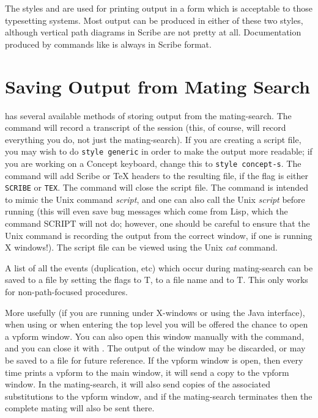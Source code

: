 The styles  and  are used for printing output
in a form which is acceptable to those typesetting systems. Most {\TPS} output
can be produced in either of these two styles, although vertical path diagrams
in Scribe are not pretty at all. Documentation produced by commands like
 is always in Scribe format.


\section{Saving Output from Mating Search}

{\TPS} has several available methods of storing output from the mating-search.
The  command will record a transcript of the session
(this, of course, will record everything you do, not just the mating-search).
If you are creating a script file, you may wish to do {\tt style generic} in
order to make the output more readable; if you are working on a
Concept keyboard, change this to {\tt style concept-s}. The  command
will add Scribe or TeX headers to the resulting file, if the  flag
is either {\tt SCRIBE} or {\tt TEX}.
The  command
will close the script file. The  command is intended
to mimic the Unix command {\it script}, and one can also call the Unix
{\it script} before running {\TPS} (this will even save bug messages which come from
Lisp, which the {\TPS} command SCRIPT will not do; however, one should be careful
to ensure that the Unix command is recording the
output from the correct window, if one is running X windows!).
The script file can be viewed using the Unix {\it cat} command.

A list of all the events (duplication, etc) which occur during mating-search
can be saved to a file by setting the flags  to T,
 to a file name and  to T.
This only works for non-path-focused procedures.

More usefully (if you are running {\TPS} under X-windows or using the Java interface),
when using  or when entering the
 top level you will be offered the chance to open a vpform
window. You can also open this window manually with the 
command, and you can close it with . The output of
the window may be discarded, or may be saved to a file for future reference.
If the vpform window is open, then every time {\TPS} prints a vpform to the main
window, it will send a copy to the vpform window. In the mating-search, it will
also send copies of the associated substitutions to the vpform window, and if
the mating-search terminates then the complete mating will also be sent there.

